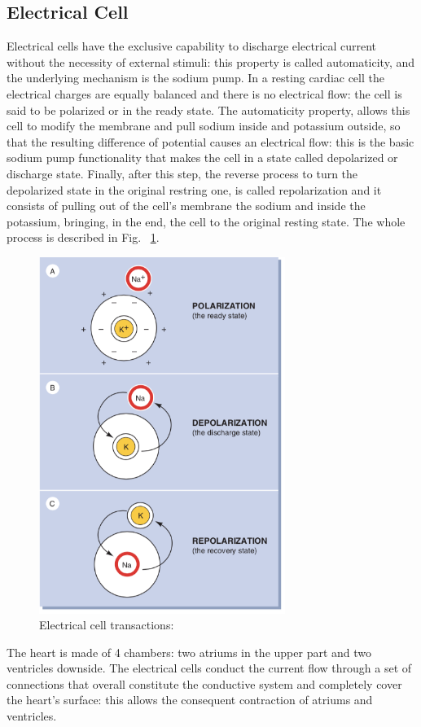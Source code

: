 \documentclass[LaM,binding=0.6cm]{sapthesis}
\begin{document}
\subsection{Electrical Cell}
Electrical cells have the exclusive capability to discharge electrical current without the necessity of external stimuli: this property is called automaticity, and the underlying mechanism is the sodium pump. In a resting cardiac cell the electrical charges are equally balanced and there is no electrical flow: the cell is said to be polarized or in the ready state. The automaticity property, allows this cell to modify the membrane and pull sodium inside and potassium outside, so that the resulting difference of potential causes an electrical flow: this is the basic sodium pump functionality that makes the cell in a state called depolarized or discharge state. Finally, after this step, the reverse process to turn the depolarized state in the original restring one, is called repolarization and it consists of pulling out of the cell's membrane the  sodium and inside the potassium, bringing, in the end, the cell to the original resting state. The whole process is described in Fig. ~\ref{fig:ecgtrans}.  
\begin{figure} \centering
    \includegraphics[width=80mm,scale=0.7]{ecgtrans}
    \caption{Electrical cell transactions: \cite{ecgbook}}
    \label{fig:ecgtrans}
\end{figure}
The heart is made of 4 chambers: two atriums in the upper part and two ventricles downside. The electrical cells conduct the current flow through a set of connections that overall constitute the conductive system and completely cover the heart's surface: this allows the consequent contraction of atriums and ventricles.
\end{document}
